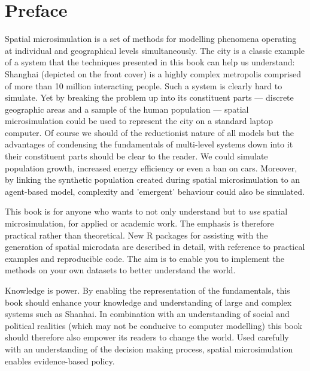 \chapter*{Preface}

Spatial microsimulation is a set of methods for modelling phenomena operating
at individual and geographical levels simultaneously.
The city is a classic example of a system that the techniques
presented in this book can help us understand: Shanghai
(depicted on the front cover) is a highly complex metropolis comprised
of more than 10 million interacting people. Such a system is clearly hard
to simulate. Yet by breaking the problem up into its
constituent parts --- discrete geographic areas and a sample of the human
population --- spatial microsimulation could be used to represent the city
on a standard laptop computer. Of course we should of the reductionist nature
of all models but the advantages of condensing the fundamentals of multi-level
systems down into it their constituent parts should be clear to the reader.
We could simulate population growth, increased energy efficiency or even
a ban on cars. Moreover, by linking the synthetic population created during
spatial microsimulation to an agent-based model, complexity and 'emergent'
behaviour could also be simulated.

This book is for anyone who wants to not only understand
but to \emph{use} spatial microsimulation, for applied or academic work.
The emphasis is therefore practical rather than theoretical.
New R packages for assisting with the generation of spatial microdata are described in
detail, with reference to practical examples and reproducible code.
The aim is to enable you to implement the methods on your own
datasets to better understand the world. 

Knowledge is power. By enabling the representation of the fundamentals,
this book should enhance your knowledge and understanding of large and complex
systems such as Shanhai. In combination with an understanding of social and
political realities (which may not be conducive to computer modelling)
this book should therefore also empower its readers to change the world.
Used carefully with an understanding of the decision making process,
spatial microsimulation enables evidence-based policy.


